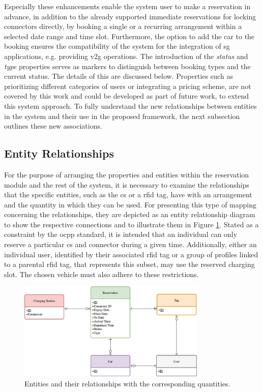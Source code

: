 \noindent Especially these enhancements enable the system user to make a reservation in advance, in addition to the already supported immediate reservations for locking connectors directly, by booking a single or a recurring arrangement within a selected date range and time slot.
Furthermore, the option to add the car to the booking ensures the compatibility of the system for the integration of \acrshort{sg} applications, e.g. providing \acrshort{v2g} operations.
The introduction of the \textit{status} and \textit{type} properties serves as markers to distinguish between booking types and the current status. The details of this are discussed below.
Properties such as prioritizing different categories of users or integrating a pricing scheme, are not covered by this work and could be developed as part of future work, to extend this system approach.
To fully understand the new relationships between entities in the system and their use in the proposed framework, the next subsection outlines these new associations.

\subsection{Entity Relationships}
\label{ch:Design:sec:Reservation:ssec:Entity Relationships}

For the purpose of arranging the properties and entities within the reservation module and the rest of the system, it is necessary to examine the relationships that the specific entities, such as the \acrshort{cs} or a \acrshort{rfid} tag, have with an arrangement and the quantity in which they can be used.
For presenting this type of mapping concerning the relationships, they are depicted as an entity relationship diagram to show the respective connections and to illustrate them in Figure \ref{fig:entity-relationship-diagram}.
Stated as a constraint by the \acrshort{ocpp} standard, it is intended that an individual can only reserve a particular \acrshort{cs} and connector during a given time. Additionally, either an individual user, identified by their associated \acrshort{rfid} tag or a group of profiles linked to a parental \acrshort{rfid} tag, that represents this subset, may use the reserved charging slot. The chosen vehicle must also adhere to these restrictions.

\begin{figure}[h]
    \centering
    \includegraphics[width=0.8\textwidth,keepaspectratio]{resources/images/main/5_design/Entities.png}
    \caption{Entities and their relationships with the corresponding quantities.}
    \label{fig:entity-relationship-diagram}
\end{figure}

